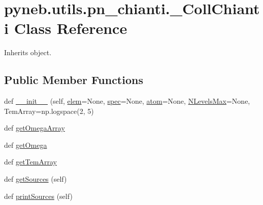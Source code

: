\hypertarget{classpyneb_1_1utils_1_1pn__chianti_1_1___coll_chianti}{}\section{pyneb.\+utils.\+pn\+\_\+chianti.\+\_\+\+Coll\+Chianti Class Reference}
\label{classpyneb_1_1utils_1_1pn__chianti_1_1___coll_chianti}


Inherits object.

\subsection*{Public Member Functions}
\begin{DoxyCompactItemize}
\item 
def \hyperlink{classpyneb_1_1utils_1_1pn__chianti_1_1___coll_chianti_acfefab5b5e07e3204550565ea2b26ceb}{\+\_\+\+\_\+init\+\_\+\+\_\+} (self, \hyperlink{classpyneb_1_1utils_1_1pn__chianti_1_1___coll_chianti_a83fc37382d9eb03922e67dacc6ca66d0}{elem}=None, \hyperlink{classpyneb_1_1utils_1_1pn__chianti_1_1___coll_chianti_a665d7e8537b9ccec445bde02d78f8e93}{spec}=None, \hyperlink{classpyneb_1_1utils_1_1pn__chianti_1_1___coll_chianti_a904418982790fd63f2324fec90636bb6}{atom}=None, \hyperlink{classpyneb_1_1utils_1_1pn__chianti_1_1___coll_chianti_aa3eaa6c3196c09e49430e4aedeea9fe1}{N\+Levels\+Max}=None, Tem\+Array=np.\+logspace(2, 5)
\item 
def \hyperlink{classpyneb_1_1utils_1_1pn__chianti_1_1___coll_chianti_a79ec638d44f16f8df85ed9978896f8a5}{get\+Omega\+Array}
\item 
def \hyperlink{classpyneb_1_1utils_1_1pn__chianti_1_1___coll_chianti_a8dd1bccc8974d0b3a44f03658e993b08}{get\+Omega}
\item 
def \hyperlink{classpyneb_1_1utils_1_1pn__chianti_1_1___coll_chianti_a625343ac2c7b1f7c72f7717f7573d90e}{get\+Tem\+Array}
\item 
def \hyperlink{classpyneb_1_1utils_1_1pn__chianti_1_1___coll_chianti_afae532a48422f25f0486164c027a3f63}{get\+Sources} (self)
\item 
def \hyperlink{classpyneb_1_1utils_1_1pn__chianti_1_1___coll_chianti_a7e3b3af06277a89015cea46d6ebd9ac8}{print\+Sources} (self)
\end{DoxyCompactItemize}

